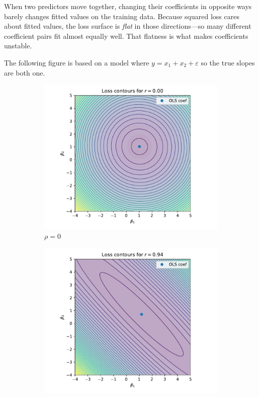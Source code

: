 When two predictors move together, changing their coefficients in opposite ways barely changes fitted values on the training data. Because squared loss cares about fitted values, the loss surface is \emph{flat} in those directions—so many different coefficient pairs fit almost equally well. That flatness is what makes coefficients unstable.


The following figure is based on a model where $y = x_1 + x_2 + \varepsilon$ so the true slopes are both one.  

\begin{figure}[H]
\centering
\begin{subfigure}[b]{0.32\textwidth}
    \centering
    \includegraphics[width=\textwidth]{images/loss_contours_r0.pdf}
    \caption{$\rho = 0$}
    \label{fig:loss-contours-r0}
\end{subfigure}
\hfill
\begin{subfigure}[b]{0.32\textwidth}
    \centering
    \includegraphics[width=\textwidth]{images/loss_contours_r94.pdf}

\end{subfigure}
\end{figure}
